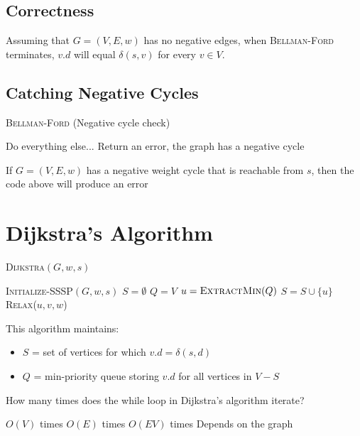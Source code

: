 \documentclass[11  pt]{exam}
\begin{document}
	\newpage
	
	\subsection{Correctness}
	\begin{theorem}
		Assuming that $G = (V,E,w)$ has no negative edges, when \textsc{Bellman-Ford} terminates, $v.d$ will equal $\delta(s,v)$ for every $v \in V$. 
	\end{theorem}
	
	
	\newpage
	
	
	\subsection{Catching Negative Cycles}
	\begin{algorithm}
		\textsc{Bellman-Ford} (Negative cycle check)
		\begin{algorithmic}
			\State Do everything else...
			\State Return an error, the graph has a negative cycle
			\EndIf
			\EndFor
		\end{algorithmic}
	\end{algorithm}
	
	\begin{theorem}
		If $G = (V,E,w)$ has a negative weight cycle that is reachable from $s$, then the code above will produce an error
	\end{theorem}
	
	\newpage
	
		\section{Dijkstra's Algorithm}
	\begin{algorithm}
		\textsc{Dijkstra}$(G,w,s)$
		\begin{algorithmic}
			\State \textsc{Initialize-SSSP}$(G,w,s)$
			\State $S = \emptyset$
			\State $Q = V$
			\While{$Q \neq \emptyset$}
			\State $u = \textsc{ExtractMin}(Q)$
			\State $S = S \cup \{u\}$
			\For{$v \in \text{Adj}[u]$}
			\State \textsc{Relax}($u,v,w$)
			\EndFor
			\EndWhile
		\end{algorithmic}
	\end{algorithm}
	
	This algorithm maintains:
	\begin{itemize}
		\item $S$ = set of vertices for which $v.d = \delta(s,d)$
		\item $Q$ = min-priority queue storing $v.d$ for all vertices in $V-S$ 
	\end{itemize}
	\vs{2cm}
	\begin{Qu}
		How many times does the while loop in Dijkstra's algorithm iterate?
		\begin{itemize}
			\aitem $O(V)$ times
			\bitem $O(E)$ times
			\citem $O(EV)$ times
			\ditem Depends on the graph
		\end{itemize}
	\end{Qu}
	
\end{document}
